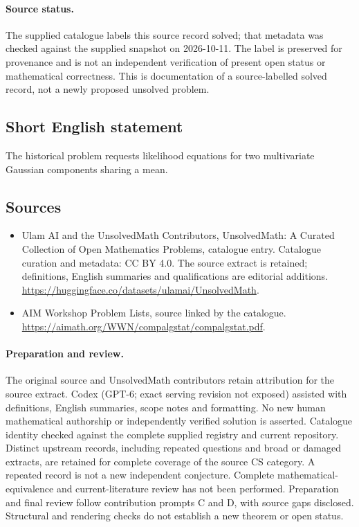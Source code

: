 \documentclass[11pt]{article}
\begin{document}
\paragraph{Source status.}
The supplied catalogue labels this source record solved; that metadata was checked against the supplied snapshot on 2026-10-11. The label is preserved for provenance and is not an independent verification of present open status or mathematical correctness. This is documentation of a source-labelled solved record, not a newly proposed unsolved problem.
\subsection{Short English statement}
The historical problem requests likelihood equations for two multivariate Gaussian components sharing a mean.
\subsection{Sources}
\begin{itemize}
\item[\hypertarget{source:statement:1}{S1}] Ulam AI and the UnsolvedMath Contributors, UnsolvedMath: A Curated Collection of Open Mathematics Problems, catalogue entry. Catalogue curation and metadata: CC BY 4.0. The source extract is retained; definitions, English summaries and qualifications are editorial additions.
\url{https://huggingface.co/datasets/ulamai/UnsolvedMath}.
\item[\hypertarget{source:statement:2}{S2}] AIM Workshop Problem Lists, source linked by the catalogue.
\url{https://aimath.org/WWN/compalgstat/compalgstat.pdf}.
\end{itemize}
\paragraph{Preparation and review.}
The original source and UnsolvedMath contributors retain attribution for the source extract. Codex (GPT-6; exact serving revision not exposed) assisted with definitions, English summaries, scope notes and formatting. No new human mathematical authorship or independently verified solution is asserted. Catalogue identity checked against the complete supplied registry and current repository. Distinct upstream records, including repeated questions and broad or damaged extracts, are retained for complete coverage of the source CS category. A repeated record is not a new independent conjecture. Complete mathematical-equivalence and current-literature review has not been performed. Preparation and final review follow contribution prompts C and D, with source gaps disclosed. Structural and rendering checks do not establish a new theorem or open status.
\label{end:statement}
\end{document}
